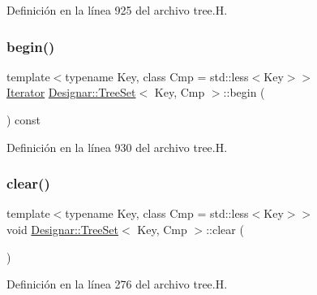 Definición en la línea 925 del archivo tree.\+H.

\mbox{\label{class_designar_1_1_tree_set_ae2bb7c7ab6f5079bc8995821aa9bedfb}} 
\subsubsection{\texorpdfstring{begin()}{begin()}\hspace{0.1cm}{\footnotesize\ttfamily [2/2]}}
{\footnotesize\ttfamily template$<$typename Key, class Cmp = std\+::less$<$\+Key$>$$>$ \\
\hyperlink{class_designar_1_1_tree_set_1_1_iterator}{Iterator} \hyperlink{class_designar_1_1_tree_set}{Designar\+::\+Tree\+Set}$<$ Key, Cmp $>$\+::begin (\begin{DoxyParamCaption}{ }\end{DoxyParamCaption}) const\hspace{0.3cm}{\ttfamily [inline]}}



Definición en la línea 930 del archivo tree.\+H.

\mbox{\label{class_designar_1_1_tree_set_af3b2a6ab8c7f7fd7c319a392c33fd9d6}} 
\subsubsection{\texorpdfstring{clear()}{clear()}}
{\footnotesize\ttfamily template$<$typename Key, class Cmp = std\+::less$<$\+Key$>$$>$ \\
void \hyperlink{class_designar_1_1_tree_set}{Designar\+::\+Tree\+Set}$<$ Key, Cmp $>$\+::clear (\begin{DoxyParamCaption}{ }\end{DoxyParamCaption})\hspace{0.3cm}{\ttfamily [inline]}}



Definición en la línea 276 del archivo tree.\+H.

\mbox{\label{class_designar_1_1_tree_set_a4069f037294163ea3686689c04486c58}} 
